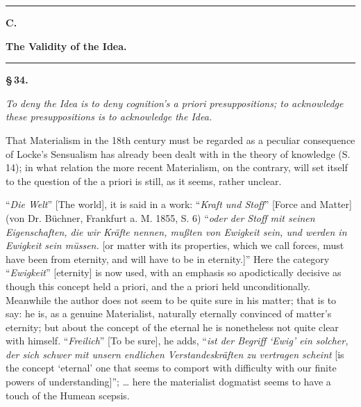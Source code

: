 \documentclass[12pt]{book}
\begin{document}
\begin{center}\rule{0.35\linewidth}{0.4pt}\end{center}

\begin{center}
  {\large\bfseries C.}\par\vspace{2pt}
  {\bfseries The Validity of the Idea.}\par\vspace{4pt}
  \rule{2cm}{0.4pt}
\end{center}
{}

\begin{center}{\bfseries \S\,34.}\end{center}

\emph{To deny the Idea is to deny cognition's a priori presuppositions; to acknowledge these
presuppositions is to acknowledge the Idea.}

That Materialism in the 18th century must be regarded as a peculiar consequence of Locke's Sensualism
has already been dealt with in the theory of knowledge (S. 14); in what relation the more recent
Materialism, on the contrary, will set itself to the question of the a priori is still, as it seems,
rather unclear.

``\textit{Die Welt}'' [The world], it is said in a work: ``\textit{Kraft und Stoff}'' [Force and Matter]
(von Dr. Büchner, Frankfurt a. M. 1855, S. 6) ``\textit{oder der Stoff mit seinen Eigenschaften, die wir
Kräfte nennen, mußten von Ewigkeit sein, und werden in Ewigkeit sein müssen.} [or matter with its
properties, which we call forces, must have been from eternity, and will have to be in eternity.]''
Here the category ``\textit{Ewigkeit}'' [eternity] is now used, with an emphasis so apodictically
decisive as though this concept held a priori, and the a priori held unconditionally. Meanwhile the
author does not seem to be quite sure in his matter; that is to
say: he is, as a genuine Materialist, naturally eternally convinced of matter's eternity; but about the
concept of the eternal he is nonetheless not quite clear with himself. ``\textit{Freilich}'' [To be
sure], he adds, ``\textit{ist der Begriff `Ewig' ein solcher, der sich schwer mit unsern endlichen
Verstandeskräften zu vertragen scheint} [is the concept `eternal' one that seems to comport with
difficulty with our finite powers of understanding]''; \ldots{} here the materialist dogmatist seems to
have a touch of the Humean scepsis.
\end{document}
